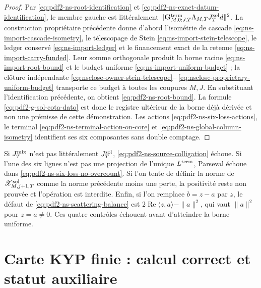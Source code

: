 \begin{proof}
Par \eqref{eq:pdf2-ns-root-identification} et
\eqref{eq:pdf2-ns-exact-datum-identification}, le membre gauche est
littéralement
$\|\mathbf G_{M,0;J,T}^{\rm term}\Lambda_{M,T}J_T^{\rm sol}d\|^2$.
La construction propriétaire précédente donne d'abord l'isométrie de cascade
\eqref{eq:ns-import-cascade-isometry}, le télescopage de Stein
\eqref{eq:ns-import-stein-telescope}, le ledger conservé
\eqref{eq:ns-import-ledger} et le financement exact de la retenue
\eqref{eq:ns-import-carry-funded}. Leur somme orthogonale produit la borne racine
\eqref{eq:ns-import-root-bound} et le budget uniforme
\eqref{eq:ns-import-uniform-budget} ; la clôture indépendante
\eqref{eq:nsclose-owner-stein-telescope}--
\eqref{eq:nsclose-proprietary-uniform-budget} transporte ce budget à
toutes les coupures \(M,J\). En substituant l'identification précédente, on obtient
\eqref{eq:pdf2-ns-root-bound}. La formule
\eqref{eq:pdf2-g-sol-cota-dato} est donc le registre ultérieur de la
borne déjà dérivée et non une prémisse de cette démonstration. Les actions
\eqref{eq:pdf2-ns-six-loss-actions}, le terminal
\eqref{eq:pdf2-ns-terminal-action-on-core} et
\eqref{eq:pdf2-ns-global-column-isometry} identifient ses six composantes
sans double comptage.
\end{proof}

\begin{falsifier}
Si $J_T^{\rm mix}$ n'est pas littéralement $J_T^{\rm sol}$,
\eqref{eq:pdf2-ns-source-colligation} échoue. Si l'une des six lignes n'est pas une
projection de l'unique $L^{\rm term}$, Parseval échoue dans
\eqref{eq:pdf2-ns-six-loss-no-overcount}. Si l'on tente de définir la norme de
$\mathscr X_{M,j+1,T}^{\rm sol}$ comme la norme précédente moins une perte,
la positivité reste non prouvée et l'opération est interdite. Enfin, si
l'on remplace $b=z-a$ par $z$, le défaut de
\eqref{eq:pdf2-ns-scattering-balance} est
$2\operatorname{Re}\langle z,a\rangle-\|a\|^2$, qui vaut $\|a\|^2$ pour
$z=a\ne0$. Ces quatre contrôles échouent avant d'atteindre la borne uniforme.
\end{falsifier}

\section{Carte KYP finie : calcul correct et statut auxiliaire}

